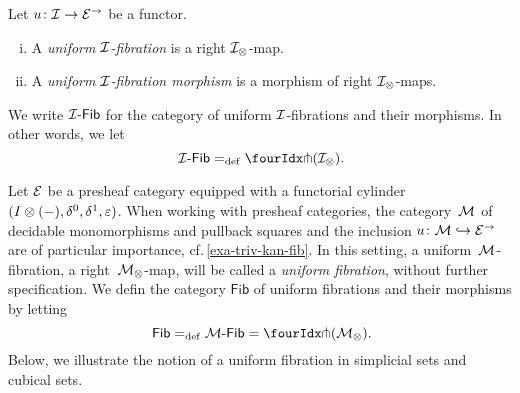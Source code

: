 \documentclass[reqno,10pt,a4paper,oneside,draft]{amsart}
\begin{document}
\begin{definition} \label{def:I-fibration}
Let $u \co \cal{I} \to \catE^\to$ be a functor.
\begin{enumerate}[(i)]
\item A \emph{uniform $\cal{I}$-fibration} is a right $\cal{I}_\otimes$-map.
\item A \emph{uniform $\cal{I}$-fibration morphism} is a morphism of right $\cal{I}_\otimes$-maps.
\end{enumerate}
\end{definition}

\medskip

We write $\Fib{\cal{I}}$ for the category of uniform $\cal{I}$-fibrations and their morphisms.
In other words, we let
\[
\Fib{\cal{I}} \defeq \liftr{(\cal{I}_\otimes)} \rlap{.}
\]

\medskip


\begin{example}
Let $\catE$ be a presheaf category equipped with a functorial cylinder $(\interval \otimes (-), \lcyl, \rcyl, \ccyl)$.
When working with presheaf categories, the category~$\cal{M}$ of decidable monomorphisms and pullback squares and the inclusion $u \co \cal{M} \hookrightarrow \cal{E}^\to$ are of particular importance, {cf.}\,\cref{exa-triv-kan-fib}.
In this setting, a uniform~$\cal{M}$-fibration, \ie a right~$\cal{M}_\otimes$-map, will be called a \emph{uniform fibration}, without further specification.
We defin the category $\mathsf{Fib}$ of uniform fibrations and their morphisms by letting
\[
\mathsf{Fib} \defeq \Fib{\cal{M}} = \liftr{(\cal{M}_\otimes)} \rlap{.}
\]
Below, we illustrate the notion of a uniform fibration in simplicial sets and cubical sets.
\end{example}
\end{document}

